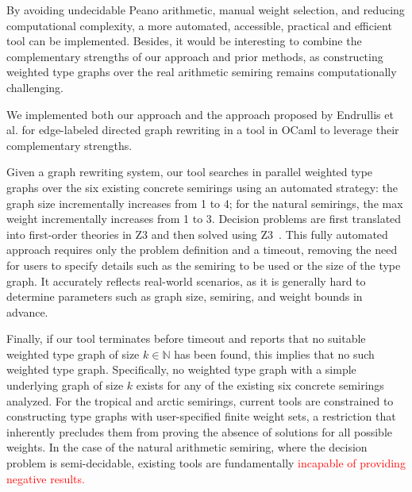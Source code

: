 By avoiding undecidable Peano arithmetic, manual weight selection, and reducing computational complexity, a more automated, accessible, practical and efficient tool can be implemented. Besides, it would be interesting to
combine the complementary strengths of our approach and prior methods, as constructing weighted type graphs over the real arithmetic semiring remains computationally challenging.

We implemented both our approach and the approach proposed by Endrullis et al. \cite{endrullis2024generalized} for edge-labeled directed graph rewriting in a tool in OCaml to leverage their complementary strengths.

Given a graph rewriting system, our tool searches in parallel weighted type graphs over the six existing concrete semirings using an automated strategy: the graph size incrementally increases from 1 to 4; for the natural semirings, the max weight incrementally increases from 1 to 3. Decision problems are first translated into first-order theories in Z3 and then solved using Z3~\cite{de2008z3}.
This fully automated approach requires only the problem definition and a timeout, removing the need for users to specify details such as the semiring to be used or the size of the type graph. 
It accurately reflects real-world scenarios, as it is generally hard to determine parameters such as graph size, semiring, and weight bounds in advance.

Finally, if our tool terminates before timeout and reports that no suitable weighted type graph of size \( k \mathop{\in} \mathbb{N} \) has been found, this implies that no such weighted type graph. Specifically, no weighted type graph with a simple underlying graph of size \( k \) exists for any of the existing six concrete semirings analyzed. 
For the tropical and arctic semirings, current tools are constrained to constructing type graphs with user-specified finite weight sets, a restriction that inherently precludes them from proving the absence of solutions for all possible weights. In the case of the natural arithmetic semiring, where the decision problem is semi-decidable, existing tools are fundamentally \textcolor{red}{incapable of providing negative results.}